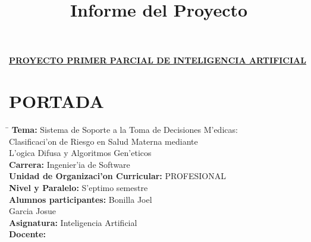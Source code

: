 \documentclass[11pt]{article}
\title{Informe del Proyecto}
\begin{document}
\titleformat{\section}{\normalfont\Large\bfseries}{\thesection}{1em}{}
\renewcommand{\thesection}{\Roman{section}}
\titleformat{\paragraph}[block]{\normalfont\bfseries}{}{0em}{}
\begin{center}
    \textbf{\underline{\normalsize PROYECTO PRIMER PARCIAL DE INTELIGENCIA ARTIFICIAL}}\\[0.5cm]
\end{center}

\section{PORTADA}

\begin{tabbing}
    \hspace{7.5cm} \= \kill
    \textbf{Tema:} \> Sistema de Soporte a la Toma de Decisiones M\a'{e}dicas: \\
    \> Clasificaci\a'{o}n de Riesgo en Salud Materna mediante \\
    \> L\a'{o}gica Difusa y Algoritmos Gen\a'{e}ticos \\
    \textbf{Carrera:} \> Ingenier\a'{i}a de Software \\
    \textbf{Unidad de Organizaci\a'{o}n Curricular:} \> PROFESIONAL \\
    \textbf{Nivel y Paralelo:} \> S\a'{e}ptimo semestre \\
    \textbf{Alumnos participantes:} \> Bonilla Joel \\
    \> Garcia Josue \\
    \textbf{Asignatura:} \> Inteligencia Artificial \\
    \textbf{Docente:} \> %
\end{tabbing}

\end{document}
